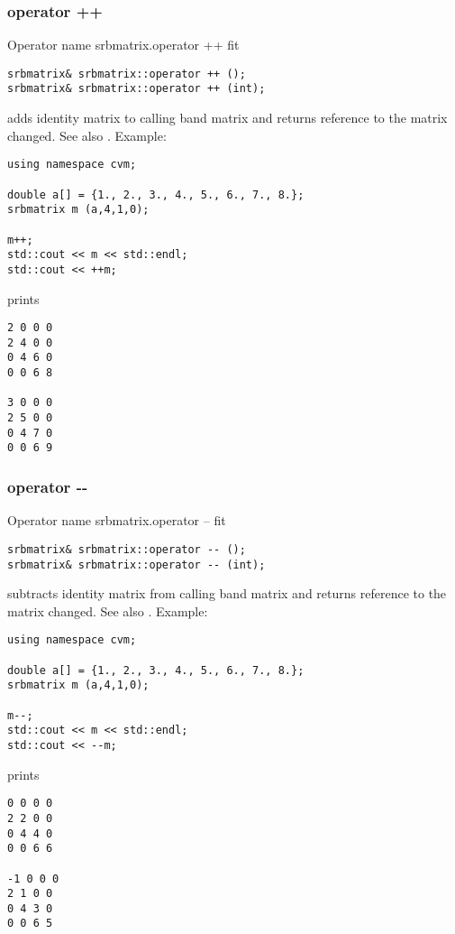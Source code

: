 \subsubsection{operator ++}
Operator%
\pdfdest name {srbmatrix.operator ++} fit
\begin{verbatim}
srbmatrix& srbmatrix::operator ++ ();
srbmatrix& srbmatrix::operator ++ (int);
\end{verbatim}
adds identity matrix to  calling band matrix
and returns  reference to
the matrix changed.
See also .
Example:
\begin{Verbatim}
using namespace cvm;

double a[] = {1., 2., 3., 4., 5., 6., 7., 8.};
srbmatrix m (a,4,1,0);

m++;
std::cout << m << std::endl;
std::cout << ++m;
\end{Verbatim}
prints
\begin{Verbatim}
2 0 0 0
2 4 0 0
0 4 6 0
0 0 6 8

3 0 0 0
2 5 0 0
0 4 7 0
0 0 6 9
\end{Verbatim}
\newpage



\subsubsection{operator -{}-}
Operator%
\pdfdest name {srbmatrix.operator --} fit
\begin{verbatim}
srbmatrix& srbmatrix::operator -- ();
srbmatrix& srbmatrix::operator -- (int);
\end{verbatim}
subtracts identity matrix from  calling band matrix
and returns  reference to
the matrix changed.
See also .
Example:
\begin{Verbatim}
using namespace cvm;

double a[] = {1., 2., 3., 4., 5., 6., 7., 8.};
srbmatrix m (a,4,1,0);

m--;
std::cout << m << std::endl;
std::cout << --m;
\end{Verbatim}
prints
\begin{Verbatim}
0 0 0 0
2 2 0 0
0 4 4 0
0 0 6 6

-1 0 0 0
2 1 0 0
0 4 3 0
0 0 6 5
\end{Verbatim}
\newpage




